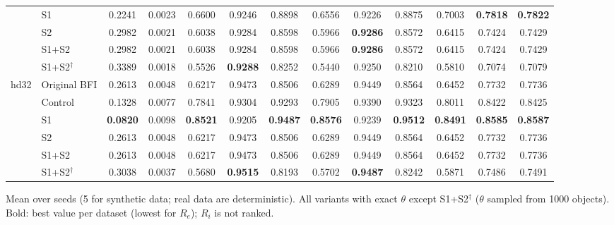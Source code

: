 \documentclass[journal]{IEEEtran}
\begin{document}
\begin{table}[!t]
\begin{tabular}{llccccccccccc}
 & S1 & 0.2241 & 0.0023 & 0.6600 & 0.9246 & 0.8898 & 0.6556 & 0.9226 & 0.8875 & 0.7003 & \textbf{0.7818} & \textbf{0.7822} \\
 & S2 & 0.2982 & 0.0021 & 0.6038 & 0.9284 & 0.8598 & 0.5966 & \textbf{0.9286} & 0.8572 & 0.6415 & 0.7424 & 0.7429 \\
 & S1+S2 & 0.2982 & 0.0021 & 0.6038 & 0.9284 & 0.8598 & 0.5966 & \textbf{0.9286} & 0.8572 & 0.6415 & 0.7424 & 0.7429 \\
 & S1+S2$^{\dagger}$ & 0.3389 & 0.0018 & 0.5526 & \textbf{0.9288} & 0.8252 & 0.5440 & 0.9250 & 0.8210 & 0.5810 & 0.7074 & 0.7079 \\
\midrule
\multirow{6}{*}{hd32} & Original BFI & 0.2613 & 0.0048 & 0.6217 & 0.9473 & 0.8506 & 0.6289 & 0.9449 & 0.8564 & 0.6452 & 0.7732 & 0.7736 \\
 & Control & 0.1328 & 0.0077 & 0.7841 & 0.9304 & 0.9293 & 0.7905 & 0.9390 & 0.9323 & 0.8011 & 0.8422 & 0.8425 \\
 & S1 & \textbf{0.0820} & 0.0098 & \textbf{0.8521} & 0.9205 & \textbf{0.9487} & \textbf{0.8576} & 0.9239 & \textbf{0.9512} & \textbf{0.8491} & \textbf{0.8585} & \textbf{0.8587} \\
 & S2 & 0.2613 & 0.0048 & 0.6217 & 0.9473 & 0.8506 & 0.6289 & 0.9449 & 0.8564 & 0.6452 & 0.7732 & 0.7736 \\
 & S1+S2 & 0.2613 & 0.0048 & 0.6217 & 0.9473 & 0.8506 & 0.6289 & 0.9449 & 0.8564 & 0.6452 & 0.7732 & 0.7736 \\
 & S1+S2$^{\dagger}$ & 0.3038 & 0.0037 & 0.5680 & \textbf{0.9515} & 0.8193 & 0.5702 & \textbf{0.9487} & 0.8242 & 0.5871 & 0.7486 & 0.7491 \\
\bottomrule
\end{tabular}
\vspace{2pt}
\parbox{\textwidth}{\footnotesize Mean over seeds (5 for synthetic data; real data are deterministic). All variants with exact $\theta$ except S1+S2$^{\dagger}$ ($\theta$ sampled from 1000 objects). Bold: best value per dataset (lowest for $R_e$); $R_i$ is not ranked.}
\end{table}
\end{document}
